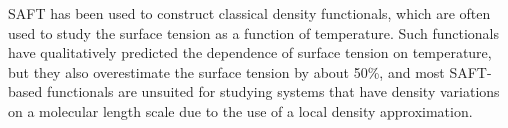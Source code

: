 \documentclass[twocolumn,amsmath,amssymb,prb]{revtex4-1}
\begin{document}
SAFT has been used to construct classical density functionals,
which are often used to study the surface tension as a function of
temperature\cite{clark2006developing, gloor2004accurate, kahl2008modified,
  gloor2007prediction, blas2001examination, kiselev2006new,
  gloor2002saft,fu2005vapor-liquid-dft, gross2009density,
  yang1994density, Jaqaman2004}.  Such
functionals have qualitatively predicted the dependence of surface
tension on temperature, but they also overestimate
the surface tension by about 50\%, and most SAFT-based functionals are
unsuited for studying systems that have density variations on a
molecular length scale due to the use of a local density
approximation\cite{gloor2002saft,clark2006developing, gloor2007prediction,
gloor2004accurate, kahl2008modified,
blas2001examination, kiselev2006new}.

\end{document}

